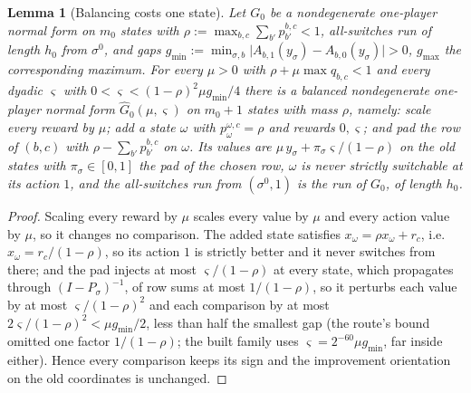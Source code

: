 \documentclass[11pt]{article}
\theoremstyle{plain}
\newtheorem{lemma}[theorem]{Lemma}
\theoremstyle{definition}
\begin{document}
\begin{lemma}[Balancing costs one state]\label{lem:balance}
Let $G_0$ be a nondegenerate one-player normal form on $m_0$ states with
$\rho:=\max_{b,c}\sum_{b'}p^{b,c}_{b'}<1$, all-switches run of length $h_0$ from
$\sigma^{0}$, and gaps
$g_{\min}:=\min_{\sigma,b}\bigl|A_{b,1}(y_\sigma)-A_{b,0}(y_\sigma)\bigr|>0$,
$g_{\max}$ the corresponding maximum. For every $\mu>0$ with
$\rho+\mu\max q_{b,c}<1$ and every dyadic $\varsigma$ with
$0<\varsigma<(1-\rho)^{2}\mu g_{\min}/4$ there is a \emph{balanced} nondegenerate
one-player normal form $\widehat G_0(\mu,\varsigma)$ on $m_0+1$ states with mass
$\rho$, namely: scale every reward by $\mu$; add a state $\omega$ with
$p^{\omega,c}_\omega=\rho$ and rewards $0,\varsigma$; and pad the row of $(b,c)$ with
$\rho-\sum_{b'}p^{b,c}_{b'}$ on $\omega$. Its values are
$\mu\,y_\sigma+\pi_{\sigma}\varsigma/(1-\rho)$ on the old states with
$\pi_\sigma\in[0,1]$ the pad of the chosen row, $\omega$ is never strictly switchable
at its action $1$, and the all-switches run from $(\sigma^{0},1)$ is the run of $G_0$,
of length $h_0$.
\end{lemma}

\begin{proof}
Scaling every reward by $\mu$ scales every value by $\mu$ and every action value by
$\mu$, so it changes no comparison. The added state satisfies
$x_\omega=\rho x_\omega+r_c$, i.e.\ $x_\omega=r_c/(1-\rho)$, so its action $1$ is
strictly better and it never switches from there; and the pad injects at
most $\varsigma/(1-\rho)$ at every state, which propagates through
$(I-P_\sigma)^{-1}$, of row sums at most $1/(1-\rho)$, so it perturbs each
value by at most $\varsigma/(1-\rho)^{2}$ and each comparison by at most
$2\varsigma/(1-\rho)^{2}<\mu g_{\min}/2$, less than half the smallest gap
(the route's bound omitted one factor $1/(1-\rho)$; the built family uses
$\varsigma=2^{-60}\mu g_{\min}$, far inside either). Hence every comparison keeps its sign and the improvement orientation on the old
coordinates is unchanged.
\end{proof}
\end{document}
